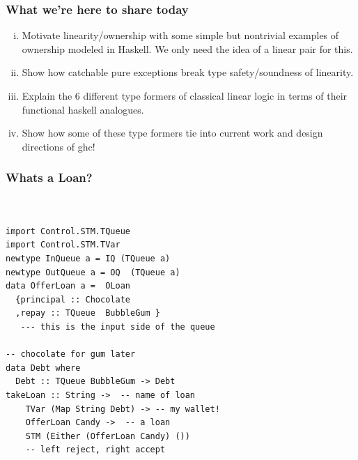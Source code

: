 \documentclass[11pt,reqno]{beamer}
\begin{document}
\begin{frame}\frametitle{What we're here to share today}
  \begin{enumerate}[(i)]
    \item Motivate linearity/ownership with some simple but nontrivial examples of ownership modeled
    in Haskell. We only need the idea of a linear pair for this.
    \item Show how catchable pure exceptions break type safety/soundness of linearity.
    \item Explain the 6 different type formers of classical linear logic in terms of
    their functional haskell analogues.
    \item Show how some of these type formers tie into current work and design directions
    of ghc!
  \end{enumerate}
\end{frame}













\begin{frame}[fragile]
\frametitle{Whats a Loan?}
\begin{verbatim}


import Control.STM.TQueue
import Control.STM.TVar
newtype InQueue a = IQ (TQueue a)
newtype OutQueue a = OQ  (TQueue a)
data OfferLoan a =  OLoan
  {principal :: Chocolate
  ,repay :: TQueue  BubbleGum }
   --- this is the input side of the queue

-- chocolate for gum later
data Debt where
  Debt :: TQueue BubbleGum -> Debt
takeLoan :: String ->  -- name of loan
    TVar (Map String Debt) -> -- my wallet!
    OfferLoan Candy ->  -- a loan
    STM (Either (OfferLoan Candy) ())
    -- left reject, right accept
\end{verbatim}
\end{frame}

\end{document}
